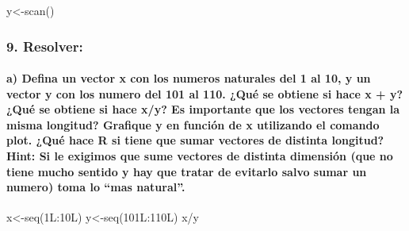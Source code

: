 \documentclass[
]{article}
\newenvironment{Shaded}{\begin{snugshade}}{\end{snugshade}}
\newcommand{\FunctionTok}[1]{\textcolor[rgb]{0.00,0.00,0.00}{#1}}
\newcommand{\NormalTok}[1]{#1}
\newcommand{\OtherTok}[1]{\textcolor[rgb]{0.56,0.35,0.01}{#1}}
\newcommand{\SpecialCharTok}[1]{\textcolor[rgb]{0.00,0.00,0.00}{#1}}
\begin{document}
\begin{Shaded}
\begin{Highlighting}[]
\NormalTok{y}\OtherTok{\textless{}{-}}\FunctionTok{scan}\NormalTok{()}
\end{Highlighting}
\end{Shaded}

\hypertarget{resolver}{%
\subsubsection{9. Resolver:}\label{resolver}}

\hypertarget{a-defina-un-vector-x-con-los-numeros-naturales-del-1-al-10-y-un-vector-y-con-los-numero-del-101-al-110.-quuxe9-se-obtiene-si-hace-x-y-quuxe9-se-obtiene-si-hace-xy-es-importante-que-los-vectores-tengan-la-misma-longitud-grafique-y-en-funciuxf3n-de-x-utilizando-el-comando-plot.-quuxe9-hace-r-si-tiene-que-sumar-vectores-de-distinta-longitud-hint-si-le-exigimos-que-sume-vectores-de-distinta-dimensiuxf3n-que-no-tiene-mucho-sentido-y-hay-que-tratar-de-evitarlo-salvo-sumar-un-numero-toma-lo-mas-natural.}{%
\paragraph{a) Defina un vector x con los numeros naturales del 1 al 10,
y un vector y con los numero del 101 al 110. ¿Qué se obtiene si hace x +
y? ¿Qué se obtiene si hace x/y? Es importante que los vectores tengan la
misma longitud? Grafique y en función de x utilizando el comando plot.
¿Qué hace R si tiene que sumar vectores de distinta longitud? Hint: Si
le exigimos que sume vectores de distinta dimensión (que no tiene mucho
sentido y hay que tratar de evitarlo salvo sumar un numero) toma lo
``mas
natural''.}\label{a-defina-un-vector-x-con-los-numeros-naturales-del-1-al-10-y-un-vector-y-con-los-numero-del-101-al-110.-quuxe9-se-obtiene-si-hace-x-y-quuxe9-se-obtiene-si-hace-xy-es-importante-que-los-vectores-tengan-la-misma-longitud-grafique-y-en-funciuxf3n-de-x-utilizando-el-comando-plot.-quuxe9-hace-r-si-tiene-que-sumar-vectores-de-distinta-longitud-hint-si-le-exigimos-que-sume-vectores-de-distinta-dimensiuxf3n-que-no-tiene-mucho-sentido-y-hay-que-tratar-de-evitarlo-salvo-sumar-un-numero-toma-lo-mas-natural.}}

\begin{Shaded}
\begin{Highlighting}[]
\NormalTok{x}\OtherTok{\textless{}{-}}\FunctionTok{seq}\NormalTok{(1L}\SpecialCharTok{:}\NormalTok{10L)}
\NormalTok{y}\OtherTok{\textless{}{-}}\FunctionTok{seq}\NormalTok{(101L}\SpecialCharTok{:}\NormalTok{110L)}
\NormalTok{x}\SpecialCharTok{/}\NormalTok{y}
\end{Highlighting}
\end{Shaded}
\end{document}
